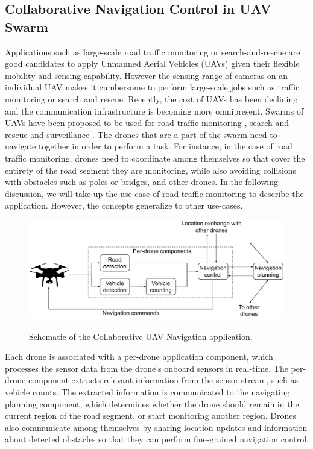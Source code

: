 \subsection{Collaborative Navigation Control in UAV Swarm}
Applications such as large-scale road traffic monitoring or search-and-rescue are good candidates to apply Unmanned Aerial Vehicles (UAVs) given their flexible mobility and sensing capability. However the sensing range of cameras on an individual UAV makes it cumbersome to perform large-scale jobs such as traffic monitoring or search and rescue. Recently, the cost of UAVs has been declining and the communication infrastructure is becoming more omnipresent. Swarms of UAVs have been proposed to be used for road traffic monitoring \cite{huang2021decentralized}, search and rescue \cite{scherer2015autonomous} and surveillance \cite{meng2015skystitch}. The drones that are a part of the swarm need to navigate together in order to perform a task. For instance, in the case of road traffic monitoring, drones need to coordinate among themselves so that cover the entirety of the road segment they are monitoring, while also avoiding collisions with obstacles such as poles or bridges, and other drones. In the following discussion, we will take up the use-case of road traffic monitoring to describe the application. However, the concepts generalize to other use-cases.

\begin{figure}[h]
\centering
\includegraphics[width=0.75\columnwidth]{figures/apps/collab_drone_navigation}
\label{fig:collab_drone_navig}
\caption{Schematic of the Collaborative UAV Navigation application.}
\end{figure}

\par Each drone is associated with a per-drone application component, which processes the sensor data from the drone's onboard sensors in real-time. The per-drone component extracts relevant information from the sensor stream, such as vehicle counts. The extracted information is communicated to the navigating planning component, which determines whether the drone should remain in the current region of the road segment, or start monitoring another region. Drones also communicate among themselves by sharing location updates and information about detected obstacles so that they can perform fine-grained navigation control.

